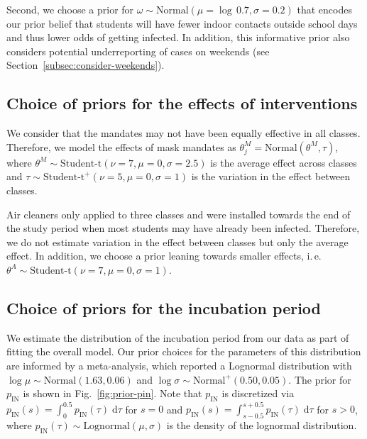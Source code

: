 \documentclass[fleqn,11pt]{wlscirep_supp}
\newcommand\ie{i.\,e.\xspace}
\begin{document}
Second, we choose a prior for $\omega \sim \textrm{Normal}(\mu = \log\,0.7, \sigma = 0.2)$ that encodes our prior belief that students will have fewer indoor contacts outside school days and thus lower odds of getting infected. In addition, this informative prior also considers potential underreporting of cases on weekends (see Section~\ref{subsec:consider-weekends}).  

\clearpage

\subsection{Choice of priors for the effects of interventions}

We consider that the mandates may not have been equally effective in all classes. Therefore, we model the effects of mask mandates as $\theta_{j}^M = \textrm{Normal}(\theta^M, \tau)$, where $\theta^M \sim \textrm{Student-t}(\nu = 7, \mu = 0, \sigma = 2.5)$ is the average effect across classes and $\tau \sim \textrm{Student-t}^{+}(\nu = 5, \mu = 0, \sigma = 1)$ is the variation in the effect between classes. 

Air cleaners only applied to three classes and were installed towards the end of the study period when most students may have already been infected. Therefore, we do not estimate variation in the effect between classes but only the average effect. In addition, we choose a prior leaning towards smaller effects, \ie $\theta^A \sim \textrm{Student-t}(\nu = 7, \mu = 0, \sigma = 1)$.

\subsection{Choice of priors for the incubation period}\label{subsec:prior-incubation-period} 

We estimate the distribution of the incubation period from our data as part of fitting the overall model. Our prior choices for the parameters of this distribution are informed by a meta-analysis\cite{McAloon2020}, which reported a Lognormal distribution with $\log \mu \sim \textrm{Normal}(1.63, 0.06)$ and $\log \sigma \sim \textrm{Normal}^{\textrm{+}}(0.50, 0.05)$. The prior for $p_\text{IN}$ is shown in Fig.~\ref{fig:prior-pin}. Note that $p_\text{IN}$ is discretized via $p_\text{IN}(s) = \int_0^{0.5} p_\text{IN}(\tau) \;\text{d}\tau$ for $s = 0$ and $p_\text{IN}(s) = \int_{s-0.5}^{s+0.5} p_\text{IN}(\tau) \;\text{d}\tau$ for $s > 0$, where $p_\text{IN}(\tau) \sim \textrm{Lognormal}(\mu, \sigma)$ is the density of the lognormal distribution. 
\end{document}
